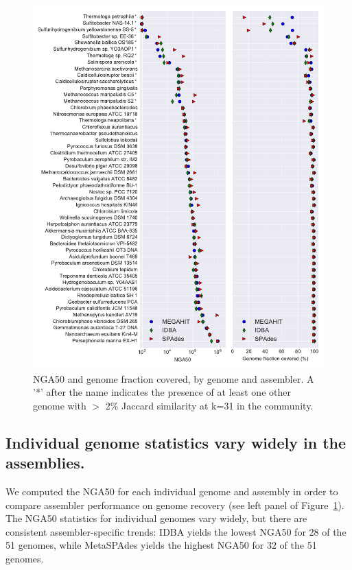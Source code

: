 \documentclass[11pt]{article}
\begin{document}
\begin{figure}[!h]
\centering
\includegraphics[width=\textwidth]{combined.pdf}  
\caption{NGA50 and genome fraction covered, by genome and assembler. A '*' after the name indicates the presence of at least one other genome with $>$ 2\% Jaccard similarity at k=31 in the community.}
\label{fig:nga50}
\end{figure}

\newpage

\subsection*{Individual genome statistics vary widely in the assemblies.}

We computed the NGA50 for each individual genome and assembly in order
to compare assembler performance on genome recovery (see left panel of
Figure~\ref{fig:nga50}).  The NGA50 statistics for individual genomes
vary widely, but there are consistent assembler-specific trends: IDBA
yields the lowest NGA50 for 28 of the 51 genomes, while MetaSPAdes yields
the highest NGA50 for 32 of the 51 genomes.
\end{document}

